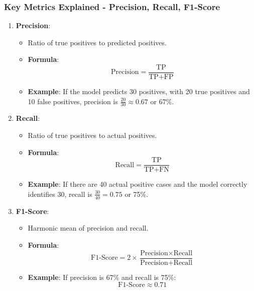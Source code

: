 \documentclass[aspectratio=169]{beamer}
\begin{document}
\begin{frame}[fragile]
    \frametitle{Key Metrics Explained - Precision, Recall, F1-Score}
    \begin{enumerate}
        \item \textbf{Precision}:
            \begin{itemize}
                \item Ratio of true positives to predicted positives.
                \item \textbf{Formula}:
                    \begin{equation}
                    \text{Precision} = \frac{\text{TP}}{\text{TP} + \text{FP}}
                    \end{equation}
                \item \textbf{Example}: 
                    If the model predicts 30 positives, with 20 true positives and 10 false positives, precision is \( \frac{20}{30} \approx 0.67 \) or 67\%.
            \end{itemize}
        
        \item \textbf{Recall}:
            \begin{itemize}
                \item Ratio of true positives to actual positives.
                \item \textbf{Formula}:
                    \begin{equation}
                    \text{Recall} = \frac{\text{TP}}{\text{TP} + \text{FN}}
                    \end{equation}
                \item \textbf{Example}:
                    If there are 40 actual positive cases and the model correctly identifies 30, recall is \( \frac{30}{40} = 0.75 \) or 75\%.
            \end{itemize}
            
        \item \textbf{F1-Score}:
            \begin{itemize}
                \item Harmonic mean of precision and recall.
                \item \textbf{Formula}:
                    \begin{equation}
                    \text{F1-Score} = 2 \times \frac{\text{Precision} \times \text{Recall}}{\text{Precision} + \text{Recall}}
                    \end{equation}
                \item \textbf{Example}:
                    If precision is 67\% and recall is 75\%: 
                    \[
                    \text{F1-Score} \approx 0.71
                    \]
            \end{itemize}
    \end{enumerate}
\end{frame}
\end{document}
